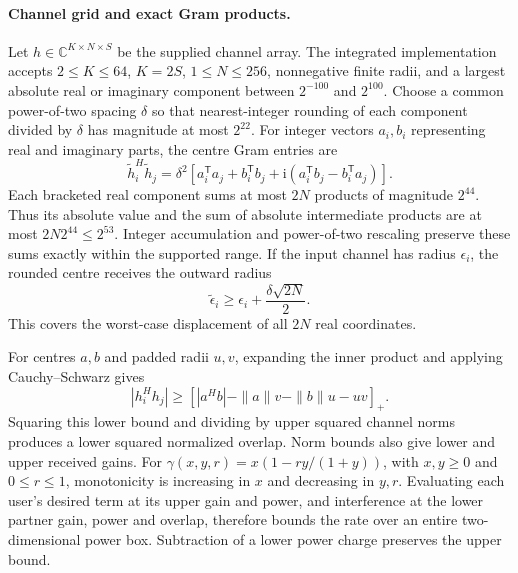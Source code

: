 \documentclass[10pt,letterpaper]{article}
\begin{document}
\paragraph{Channel grid and exact Gram products.}
Let \(h\in\mathbb C^{K\times N\times S}\) be the supplied channel array. The integrated implementation accepts \(2\leq K\leq64\), \(K=2S\), \(1\leq N\leq256\), nonnegative finite radii, and a largest absolute real or imaginary component between \(2^{-100}\) and \(2^{100}\). Choose a common power-of-two spacing \(\delta\) so that nearest-integer rounding of each component divided by \(\delta\) has magnitude at most \(2^{22}\). For integer vectors \(a_i,b_i\) representing real and imaginary parts, the centre Gram entries are
\begin{equation}
 \widetilde h_i^H\widetilde h_j
 =\delta^2\left[
    a_i^\mathsf T a_j+b_i^\mathsf T b_j
    +\mathrm i(a_i^\mathsf T b_j-b_i^\mathsf T a_j)\right].
\end{equation}
Each bracketed real component sums at most \(2N\) products of magnitude \(2^{44}\). Thus its absolute value and the sum of absolute intermediate products are at most
\(2N2^{44}\leq2^{53}\). Integer accumulation and power-of-two rescaling preserve these sums exactly within the supported range. If the input channel has radius \(\epsilon_i\), the rounded centre receives the outward radius
\begin{equation}
 \widetilde\epsilon_i\geq\epsilon_i+\frac{\delta\sqrt{2N}}{2}.
\end{equation}
This covers the worst-case displacement of all \(2N\) real coordinates.

For centres \(a,b\) and padded radii \(u,v\), expanding the inner product and applying Cauchy--Schwarz gives
\begin{equation}
 |h_i^Hh_j|\geq
 \left[|a^Hb|-\|a\|v-\|b\|u-uv\right]_+ .
\end{equation}
Squaring this lower bound and dividing by upper squared channel norms produces a lower squared normalized overlap. Norm bounds also give lower and upper received gains. For
\(\gamma(x,y,r)=x(1-r y/(1+y))\), with \(x,y\geq0\) and \(0\leq r\leq1\), monotonicity is increasing in \(x\) and decreasing in \(y,r\). Evaluating each user's desired term at its upper gain and power, and interference at the lower partner gain, power and overlap, therefore bounds the rate over an entire two-dimensional power box. Subtraction of a lower power charge preserves the upper bound.
\end{document}
